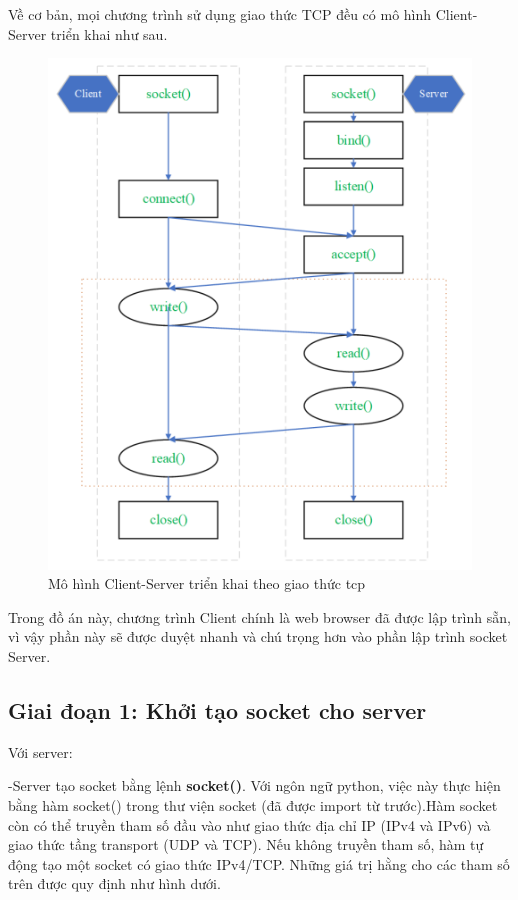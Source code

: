 \documentclass[14pt]{extreport}
\begin{document}
Về cơ bản, mọi chương trình sử dụng giao thức TCP  đều có mô hình Client-Server triển khai như sau.
\begin{center}
    \begin{figure}[H]
    \begin{center}
     \includegraphics[scale=.65]{mo hinh trien khai tcp.PNG}
    \end{center}
    \caption{Mô hình Client-Server triển khai theo giao thức tcp}
    \label{refhinh1}
    \end{figure}
\end{center}

Trong đồ án này, chương trình Client chính là web browser đã được lập trình sẵn, vì vậy phần này sẽ được duyệt nhanh và chú trọng hơn vào phần lập trình socket Server.
\subsection{Giai đoạn 1: Khởi tạo socket cho server}



Với server:

-Server tạo socket bằng lệnh {\bf socket()}. Với ngôn ngữ python, việc này thực hiện bằng hàm socket() trong thư viện socket (đã được import từ trước).Hàm socket còn có thể truyền tham số đầu vào như giao thức địa chỉ IP (IPv4 và IPv6) và giao thức tầng transport (UDP và TCP). Nếu không truyền tham số, hàm tự động tạo một socket có giao thức IPv4/TCP. Những giá trị hằng cho các tham số trên được quy định như hình dưới.
\end{document}
